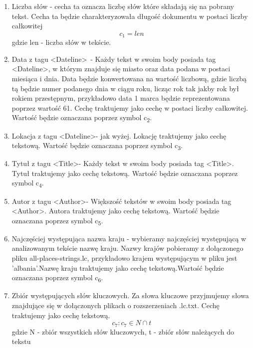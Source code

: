 \documentclass{classrep}
\begin{document}
\begin{enumerate}
  \item Liczba słów - cecha ta oznacza liczbę słów które składają się na pobrany tekst. Cecha ta będzie charakteryzowała długość dokumentu w postaci liczby całkowitej \begin{equation}  c_1 = len \end{equation} gdzie len - liczba słów w tekście.\\
 \item Data z tagu  \textless Dateline\textgreater\ - Każdy tekst w swoim body posiada tag \textless Dateline\textgreater , w którym znajduje się miasto oraz data podana w postaci miesiąca i dnia. Data będzie konwertowana na wartość liczbową, gdzie liczbą tą będzie numer podanego dnia w ciągu roku, licząc rok tak jakby rok był rokiem przestępnym, przykładowo data 1 marca będzie reprezentowana poprzez wartość 61. Cechę traktujemy jako cechę w postaci liczby całkowitej. Wartość będzie oznaczana poprzez symbol  c\textsubscript{2}.    \\
  \item Lokacja z tagu \textless Dateline\textgreater - jak wyżej. Lokację traktujemy jako cechę tekstową. Wartość będzie oznaczana poprzez symbol  c\textsubscript{3}. \\
  \item Tytuł z tagu \textless Title\textgreater - Każdy tekst w swoim body posiada tag \textless Title\textgreater. Tytuł traktujemy jako cechę tekstową. Wartość będzie oznaczana poprzez symbol  c\textsubscript{4}.\\
  \item Autor z tagu \textless Author\textgreater - Większość tekstów w swoim body posiada tag \textless Author\textgreater. Autora traktujemy jako cechę tekstową. Wartość będzie oznaczana poprzez symbol  c\textsubscript{5}.\\
  \item Najczęściej występująca nazwa kraju - wybieramy najczęściej występującą w analizowanym tekście nazwę kraju. Nazwy krajów pobieramy z dołączonego pliku all-places-strings.lc, przykładowo krajem występującym w pliku jest 'albania'.Nazwę kraju traktujemy jako cechę tekstową.Wartość będzie oznaczana poprzez symbol  c\textsubscript{6}.\\
  \item Zbiór występujących słów kluczowych. Za słowa kluczowe przyjmujemy słowa znajdujące się w dołączonych plikach o rozszerzeniach .lc.txt. Cechę traktujemy jako cechę tekstową.  \begin{equation}  c_7 : c_7 \in N \cap t \end{equation} gdzie N - zbiór wszystkich słów kluczowych, t - zbiór słów należących do tekstu\\

\end{enumerate}
\end{document}

